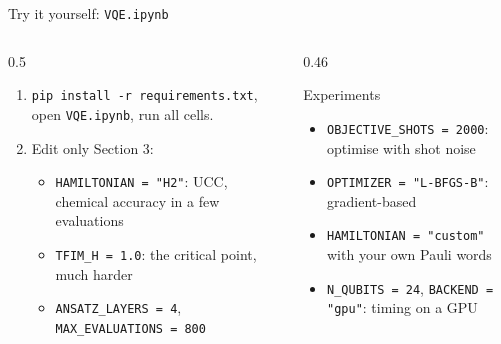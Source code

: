 \documentclass[aspectratio=169,11pt]{beamer}
\begin{document}
\begin{frame}{Try it yourself: \texttt{VQE.ipynb}}
  \begin{columns}[T]
    \begin{column}{0.5\textwidth}
      \begin{enumerate}
        \item \texttt{pip install -r requirements.txt}, open \texttt{VQE.ipynb}, run all cells.
        \item Edit only Section 3:
          \begin{itemize}
            \item \texttt{HAMILTONIAN = "H2"}: UCC, chemical accuracy in a few evaluations
            \item \texttt{TFIM\_H = 1.0}: the critical point, much harder
            \item \texttt{ANSATZ\_LAYERS = 4}, \texttt{MAX\_EVALUATIONS = 800}
          \end{itemize}
      \end{enumerate}
    \end{column}
    \begin{column}{0.46\textwidth}
      \begin{block}{Experiments}
        \begin{itemize}
          \item \texttt{OBJECTIVE\_SHOTS = 2000}: optimise with shot noise
          \item \texttt{OPTIMIZER = "L-BFGS-B"}: gradient-based
          \item \texttt{HAMILTONIAN = "custom"} with your own Pauli words
          \item \texttt{N\_QUBITS = 24}, \texttt{BACKEND = "gpu"}: timing on a GPU
        \end{itemize}
      \end{block}
    \end{column}
  \end{columns}
\end{frame}

\end{document}
